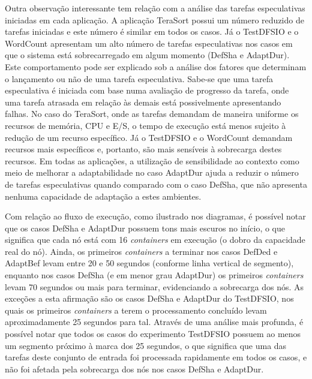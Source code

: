 Outra observação interessante tem relação com a análise das tarefas especulativas iniciadas em cada aplicação. A aplicação TeraSort possui um número reduzido de tarefas iniciadas e este número é similar em todos os casos. Já o TestDFSIO e o WordCount apresentam um alto número de tarefas especulativas nos casos em que o sistema está sobrecarregado em algum momento (DefSha e AdaptDur). Este comportamento pode ser explicado sob a análise dos fatores que determinam o lançamento ou não de uma tarefa especulativa. Sabe-se que uma tarefa especulativa é iniciada com base numa avaliação de progresso da tarefa, onde uma tarefa atrasada em relação às demais está possivelmente apresentando falhas. No caso do TeraSort, onde as tarefas demandam de maneira uniforme os recursos de memória, CPU e E/S, o tempo de execução está menos sujeito à redução de um recurso específico. Já o TestDFSIO e o WordCount demandam recursos mais específicos e, portanto, são mais sensíveis à sobrecarga destes recursos. Em todas as aplicações, a utilização de sensibilidade ao contexto como meio de melhorar a adaptabilidade no caso AdaptDur ajuda a reduzir o número de tarefas especulativas quando comparado com o caso DefSha, que não apresenta nenhuma capacidade de adaptação a estes ambientes.

Com relação ao fluxo de execução, como ilustrado nos diagramas, é possível notar que os casos DefSha e AdaptDur possuem tons mais escuros no início, o que significa que cada nó está com 16 \textit{containers} em execução (o dobro da capacidade real do nó). Ainda, os primeiros \textit{containers} a terminar nos casos DefDed e AdaptBef levam entre 20 e 50 segundos (conforme linha vertical de segmento), enquanto nos casos DefSha (e em menor grau AdaptDur) os primeiros \textit{containers} levam 70 segundos ou mais para terminar, evidenciando a sobrecarga dos nós. As exceções a esta afirmação são os casos DefSha e AdaptDur do TestDFSIO, nos quais os primeiros \textit{containers} a terem o processamento concluído levam aproximadamente 25 segundos para tal. Através de uma análise mais profunda, é possível notar que todos os casos do experimento TestDFSIO possuem ao menos um segmento próximo à marca dos 25 segundos, o que significa que uma das tarefas deste conjunto de entrada foi processada rapidamente em todos os casos, e não foi afetada pela sobrecarga dos nós nos casos DefSha e AdaptDur.

